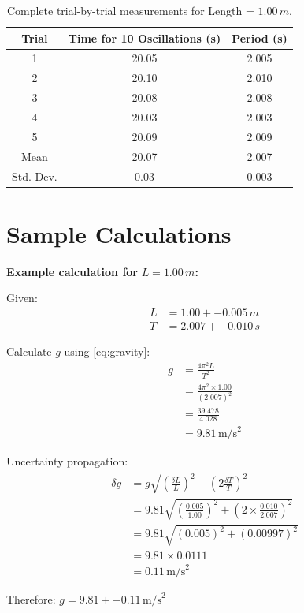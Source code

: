 \documentclass[11pt,a4paper]{article}
\providecommand{\toprule}{\hline\hline}
\providecommand{\midrule}{\hline}
\providecommand{\bottomrule}{\hline\hline}
\newcommand{\SI}[2]{#1\,#2}
\begin{document}
\begin{table}[htbp]
\centering
\caption{Complete trial-by-trial measurements for Length = $\SI{1.00}{m}$.}
\label{tab:detailed-data}
\begin{tabular}{@{}ccc@{}}
\toprule
\textbf{Trial} & \textbf{Time for 10 Oscillations (s)} & \textbf{Period (s)} \\
\midrule
1 & 20.05 & 2.005 \\
2 & 20.10 & 2.010 \\
3 & 20.08 & 2.008 \\
4 & 20.03 & 2.003 \\
5 & 20.09 & 2.009 \\
\midrule
Mean & 20.07 & 2.007 \\
Std. Dev. & 0.03 & 0.003 \\
\bottomrule
\end{tabular}
\end{table}

\section{Sample Calculations}
\label{app:calculations}


\textbf{Example calculation for} $L = \SI{1.00}{m}$\textbf{:}

Given:
\begin{align*}
    L &= \SI{1.00 +- 0.005}{m} \\
    T &= \SI{2.007 +- 0.010}{s}
\end{align*}

Calculate $g$ using \ref{eq:gravity}:
\begin{align*}
    g &= \frac{4\pi^2 L}{T^2} \\
      &= \frac{4\pi^2 \times 1.00}{(2.007)^2} \\
      &= \frac{39.478}{4.028} \\
      &= \SI{9.81}{\text{m/s}^2}
\end{align*}

Uncertainty propagation:
\begin{align*}
    \delta g &= g \sqrt{\left(\frac{\delta L}{L}\right)^2 + \left(2\frac{\delta T}{T}\right)^2} \\
             &= 9.81 \sqrt{\left(\frac{0.005}{1.00}\right)^2 + \left(2\times\frac{0.010}{2.007}\right)^2} \\
             &= 9.81 \sqrt{(0.005)^2 + (0.00997)^2} \\
             &= 9.81 \times 0.0111 \\
             &= \SI{0.11}{\text{m/s}^2}
\end{align*}

Therefore: $g = \SI{9.81 +- 0.11}{\text{m/s}^2}$
\end{document}
